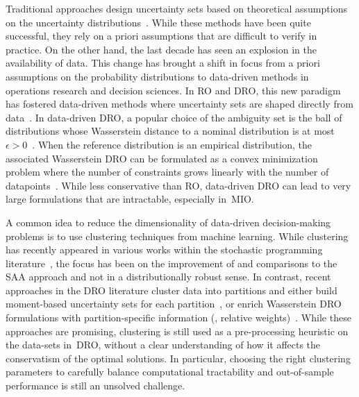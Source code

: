\documentclass[12pt]{article}
\newcommand{\citep}{\cite}
\theoremstyle{thmstyleone}%
\theoremstyle{thmstyletwo}%
\theoremstyle{thmstylethree}%
\begin{document}
Traditional approaches design uncertainty sets based on theoretical assumptions on the uncertainty distributions~\citep{ben-tal_robust_2000,bandi_tractable_2012,ben-tal_robust_2009,bertsimas_price_2004}.
While these methods have been quite successful, they rely on a priori assumptions that are difficult to verify in practice.
On the other hand, the last decade has seen an explosion in the availability of data.
This change has brought a shift in focus from a priori assumptions on the probability distributions to data-driven methods in operations research and decision sciences.
In \gls{RO} and \gls{DRO}, this new paradigm has fostered data-driven methods where uncertainty sets are shaped directly from data~\citep{bertsimas_data-driven_2018}.
In data-driven \gls{DRO}, a popular choice of the ambiguity set is the ball of distributions whose Wasserstein distance to a nominal distribution is at most $\epsilon > 0$~\cite{mohajerin_esfahani_data-driven_2018,kuhn2019wasserstein,DBLP:gao2020,gao2016distributionally}.
When the reference distribution is an empirical distribution, the associated Wasserstein \gls{DRO} can be formulated as a convex minimization problem where the number of constraints grows linearly with the number of datapoints~\citep{mohajerin_esfahani_data-driven_2018}.
While less conservative than \gls{RO}, data-driven \gls{DRO} can lead to very large formulations that are intractable, especially in~\gls{MIO}.

A common idea to reduce the dimensionality of data-driven decision-making problems  is to use clustering techniques from machine learning.
While clustering has recently appeared in various works within the stochastic programming literature~\citep{SAA1, SAA2, SAA3, SAA4}, the focus has been on the improvement of and comparisons to the \gls{SAA} approach and not in a distributionally robust sense.
In contrast, recent approaches in the \gls{DRO} literature cluster data into partitions and either build moment-based uncertainty sets for each partition~\citep{Rsome, perakis2022robust}, or enrich Wasserstein \gls{DRO} formulations with partition-specific information (\eg, relative weights)~\cite{partition}.
While these approaches are promising, clustering is still used as a pre-processing heuristic on the data-sets in~\gls{DRO}, without a clear understanding of how it affects the conservatism of the optimal solutions.
In particular, choosing the right clustering parameters to carefully balance computational tractability and out-of-sample performance is still an unsolved challenge.
\end{document}

